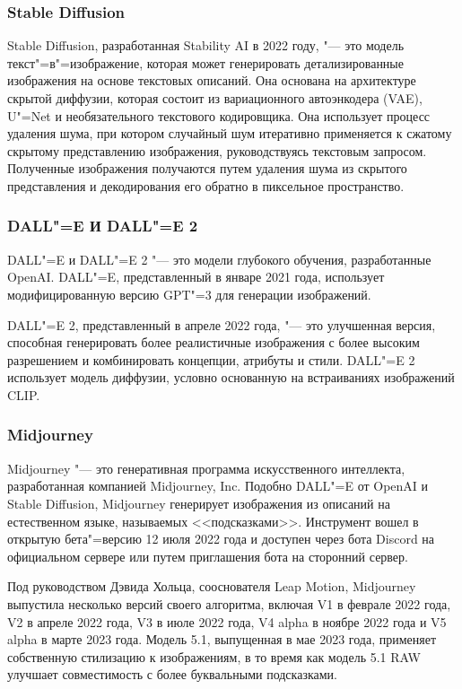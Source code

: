 \documentclass[referat]{SCWorks}
\begin{document}
\subsubsection{Stable Diffusion}
Stable Diffusion, разработанная Stability AI в 2022 году, "--- это модель текст"=в"=изображение, которая может генерировать детализированные изображения на основе текстовых описаний. Она основана на архитектуре скрытой диффузии, которая состоит из вариационного автоэнкодера (VAE), U"=Net и необязательного текстового кодировщика. Она использует процесс удаления шума, при котором случайный шум итеративно применяется к сжатому скрытому представлению изображения, руководствуясь текстовым запросом. Полученные изображения получаются путем удаления шума из скрытого представления и декодирования его обратно в пиксельное пространство\cite{VegaIT}.

\subsubsection{DALL"=E И DALL"=E 2}
DALL"=E и DALL"=E 2 "--- это модели глубокого обучения, разработанные OpenAI. DALL"=E, представленный в январе 2021 года, использует модифицированную версию GPT"=3 для генерации изображений. 

DALL"=E 2, представленный в апреле 2022 года, "--- это улучшенная версия, способная генерировать более реалистичные изображения с более высоким разрешением и комбинировать концепции, атрибуты и стили. DALL"=E 2 использует модель диффузии, условно основанную на встраиваниях изображений CLIP\cite{TechTarget}.

\subsubsection{Midjourney}
Midjourney "--- это генеративная программа искусственного интеллекта, разработанная компанией Midjourney, Inc. Подобно DALL"=E от OpenAI и Stable Diffusion, Midjourney генерирует изображения из описаний на естественном языке, называемых <<подсказками>>. Инструмент вошел в открытую бета"=версию 12 июля 2022 года и доступен через бота Discord на официальном сервере или путем приглашения бота на сторонний сервер.

Под руководством Дэвида Хольца, сооснователя Leap Motion, Midjourney выпустила несколько версий своего алгоритма, включая V1 в феврале 2022 года, V2 в апреле 2022 года, V3 в июле 2022 года, V4 alpha в ноябре 2022 года и V5 alpha в марте 2023 года. Модель 5.1, выпущенная в мае 2023 года, применяет собственную стилизацию к изображениям, в то время как модель 5.1 RAW улучшает совместимость с более буквальными подсказками\cite{BBC}.
\end{document}
